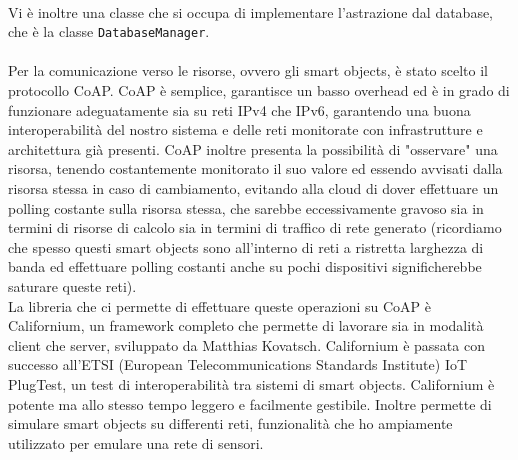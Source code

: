 \\Vi è inoltre una classe che si occupa di implementare l'astrazione dal database, che è la classe {\tt DatabaseManager}.
\\\\Per la comunicazione verso le risorse, ovvero gli smart objects, è stato scelto il protocollo CoAP. CoAP è semplice, garantisce un basso overhead ed è in grado di funzionare adeguatamente sia su reti IPv4 che IPv6, garantendo una buona interoperabilità del nostro sistema e delle reti monitorate con infrastrutture e architettura già presenti. CoAP inoltre presenta la possibilità di "osservare" una risorsa, tenendo costantemente monitorato il suo valore ed essendo avvisati dalla risorsa stessa in caso di cambiamento, evitando alla cloud di dover effettuare un polling costante sulla risorsa stessa, che sarebbe eccessivamente gravoso sia in termini di risorse di calcolo sia in termini di traffico di rete generato (ricordiamo che spesso questi smart objects sono all'interno di reti a ristretta larghezza di banda ed effettuare polling costanti anche su pochi dispositivi significherebbe saturare queste reti).
\\La libreria che ci permette di effettuare queste operazioni su CoAP è Californium, un framework completo che permette di lavorare sia in modalità client che server, sviluppato da Matthias Kovatsch. Californium è passata con successo all'ETSI (European Telecommunications Standards Institute) IoT PlugTest, un test di interoperabilità tra sistemi di smart objects. Californium è potente ma allo stesso tempo leggero e facilmente gestibile. Inoltre permette di simulare smart objects su differenti reti, funzionalità che ho ampiamente utilizzato per emulare una rete di sensori.

